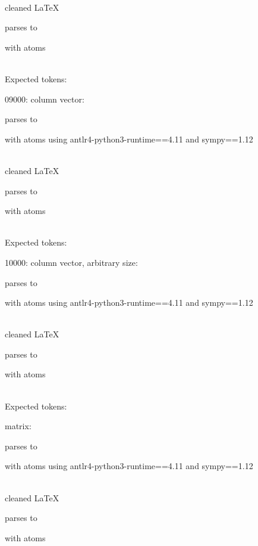 \documentclass{article}
\begin{document}
\ \\
cleaned \LaTeX

parses to

with atoms


\ \\
Expected tokens:



\hrulefill

09000:
column vector:

parses to

with atoms
using antlr4-python3-runtime==4.11 and sympy==1.12

\ \\
cleaned \LaTeX

parses to

with atoms


\ \\
Expected tokens:


\hrulefill

10000:
column vector, arbitrary size:

parses to

with atoms
using antlr4-python3-runtime==4.11 and sympy==1.12

\ \\
cleaned \LaTeX

parses to

with atoms


\ \\
Expected tokens:



\hrulefill



matrix:

parses to

with atoms
using antlr4-python3-runtime==4.11 and sympy==1.12

\ \\
cleaned \LaTeX

parses to

with atoms

\end{document}
